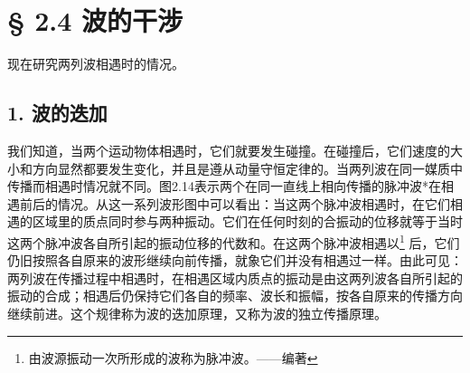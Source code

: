 \section{§ 2.4 波的干涉}\label{ux6ce2ux7684ux5e72ux6d89}

现在研究两列波相遇时的情况。

\subsection{1. 波的迭加}\label{ux6ce2ux7684ux8fedux52a0}

我们知道，当两个运动物体相遇时，它们就要发生碰撞。在碰撞后，它们速度的大小和方向显然都要发生变化，并且是遵从动量守恒定律的。当两列波在同一媒质中传播而相遇时情况就不同。图2.14表示两个在同一直线上相向传播的脉冲波*在相遇前后的情况。从这一系列波形图中可以看出：当这两个脉冲波相遇时，在它们相遇的区域里的质点同时参与两种振动。它们在任何时刻的合振动的位移就等于当时这两个脉冲波各自所引起的振动位移的代数和。在这两个脉冲波相遇以\footnote{由波源振动一次所形成的波称为脉冲波。------编著}
后，它们仍旧按照各自原来的波形继续向前传播，就象它们并没有相遇过一样。由此可见：两列波在传播过程中相遇时，在相遇区域内质点的振动是由这两列波各自所引起的振动的合成；相遇后仍保持它们各自的频率、波长和振幅，按各自原来的传播方向继续前进。这个规律称为波的迭加原理，又称为波的独立传播原理。

